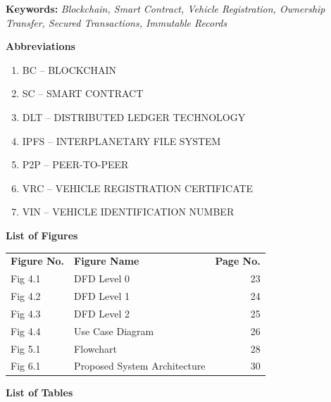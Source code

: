 \noindent
\textbf{Keywords:} \textit{Blockchain, Smart Contract, Vehicle Registration, Ownership Transfer, Secured Transactions, Immutable Records}

\newpage
\thispagestyle{empty}
\begin{center}
    \textbf{\LARGE Abbreviations}
\end{center}

\vspace{1cm}

\begin{enumerate}
    \item BC -- BLOCKCHAIN
    \item SC -- SMART CONTRACT
    \item DLT -- DISTRIBUTED LEDGER TECHNOLOGY
    \item IPFS -- INTERPLANETARY FILE SYSTEM
    \item P2P -- PEER-TO-PEER
    \item VRC -- VEHICLE REGISTRATION CERTIFICATE
    \item VIN -- VEHICLE IDENTIFICATION NUMBER
\end{enumerate}

\newpage
\thispagestyle{empty}
\begin{center}
    \textbf{\LARGE List of Figures}
\end{center}

\vspace{1cm}

\begin{tabular}{ l l r }
\textbf{Figure No.} & \textbf{Figure Name} & \textbf{Page No.} \\[0.5cm]

Fig 4.1 & DFD Level 0 & 23 \\
Fig 4.2 & DFD Level 1 & 24 \\
Fig 4.3 & DFD Level 2 & 25 \\
Fig 4.4 & Use Case Diagram & 26 \\
Fig 5.1 & Flowchart & 28 \\
Fig 6.1 & Proposed System Architecture & 30 \\

\end{tabular}

\newpage
\thispagestyle{empty}
\begin{center}
    \textbf{\LARGE List of Tables}
\end{center}

\vspace{1cm}

